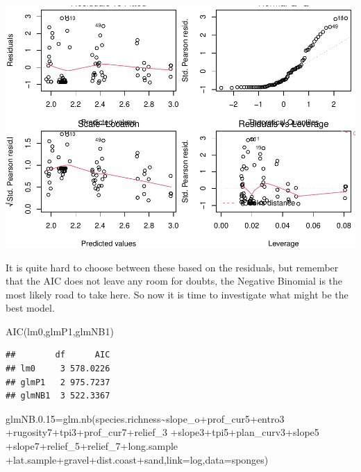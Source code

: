 \documentclass[
]{book}
\newenvironment{Shaded}{\begin{snugshade}}{\end{snugshade}}
\newcommand{\AttributeTok}[1]{\textcolor[rgb]{0.77,0.63,0.00}{#1}}
\newcommand{\FloatTok}[1]{\textcolor[rgb]{0.00,0.00,0.81}{#1}}
\newcommand{\FunctionTok}[1]{\textcolor[rgb]{0.00,0.00,0.00}{#1}}
\newcommand{\NormalTok}[1]{#1}
\newcommand{\OtherTok}[1]{\textcolor[rgb]{0.56,0.35,0.01}{#1}}
\newcommand{\SpecialCharTok}[1]{\textcolor[rgb]{0.00,0.00,0.00}{#1}}
\begin{document}
\includegraphics{ECOMODbook_files/figure-latex/unnamed-chunk-36-1.pdf}

It is quite hard to choose between these based on the residuals, but remember that the AIC does not leave any room for doubts, the Negative Binomial is the most likely road to take here. So now it is time to investigate what might be the best model.

\begin{Shaded}
\begin{Highlighting}[]
\FunctionTok{AIC}\NormalTok{(lm0,glmP1,glmNB1)}
\end{Highlighting}
\end{Shaded}

\begin{verbatim}
##        df      AIC
## lm0     3 578.0226
## glmP1   2 975.7237
## glmNB1  3 522.3367
\end{verbatim}

\begin{Shaded}
\begin{Highlighting}[]
\NormalTok{glmNB.}\FloatTok{0.15}\OtherTok{=}\FunctionTok{glm.nb}\NormalTok{(species.richness}\SpecialCharTok{\textasciitilde{}}\NormalTok{slope\_o}\SpecialCharTok{+}\NormalTok{prof\_cur5}\SpecialCharTok{+}\NormalTok{entro3 }
\SpecialCharTok{+}\NormalTok{rugosity7}\SpecialCharTok{+}\NormalTok{tpi3}\SpecialCharTok{+}\NormalTok{prof\_cur7}\SpecialCharTok{+}\NormalTok{relief\_3 }
\SpecialCharTok{+}\NormalTok{slope3}\SpecialCharTok{+}\NormalTok{tpi5}\SpecialCharTok{+}\NormalTok{plan\_curv3}\SpecialCharTok{+}\NormalTok{slope5 }
\SpecialCharTok{+}\NormalTok{slope7}\SpecialCharTok{+}\NormalTok{relief\_5}\SpecialCharTok{+}\NormalTok{relief\_7}\SpecialCharTok{+}\NormalTok{long.sample }
\SpecialCharTok{+}\NormalTok{lat.sample}\SpecialCharTok{+}\NormalTok{gravel}\SpecialCharTok{+}\NormalTok{dist.coast}\SpecialCharTok{+}\NormalTok{sand,}\AttributeTok{link=}\NormalTok{log,}\AttributeTok{data=}\NormalTok{sponges)}
\end{Highlighting}
\end{Shaded}
\end{document}
